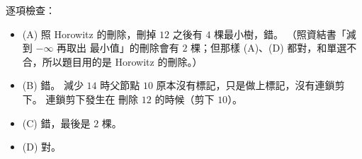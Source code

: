 \begin{pastsoln}
逐項檢查：
\begin{itemize}
\item (A) 照 Horowitz 的刪除，刪掉 $12$ 之後有 $4$ 棵最小樹，錯。 （照資結書「減到 $-\infty$ 再取出
最小值」的刪除會有 $2$ 棵；但那樣 (A)、(D) 都對，和單選不合，所以題目用的是 Horowitz 的刪除。）
\item (B) 錯。 減少 $14$ 時父節點 $10$ 原本沒有標記，只是做上標記，沒有連鎖剪下。 連鎖剪下發生在
刪除 $12$ 的時候（剪下 $10$）。
\item (C) 錯，最後是 $2$ 棵。
\item (D) 對。
\end{itemize}
\end{pastsoln}
